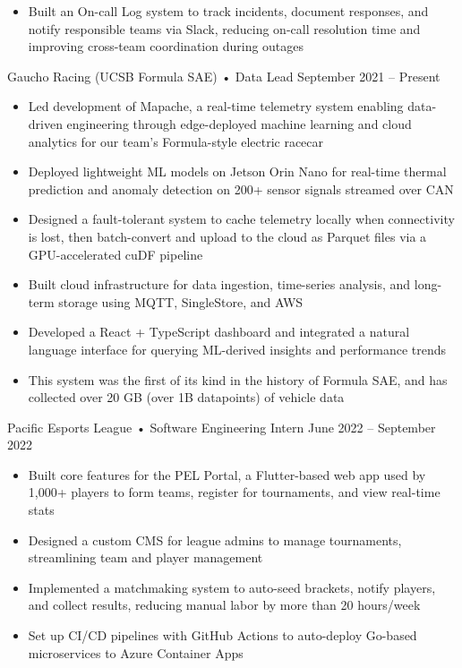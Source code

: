 \documentclass[9pt]{developercv} %
\begin{document}
\begin{entrylist}
{\begin{itemize}[noitemsep,topsep=0pt,parsep=0pt,partopsep=0pt, leftmargin=10pt]
            \item Built an On-call Log system to track incidents, document responses, and notify responsible teams via Slack, reducing on-call resolution time and improving cross-team coordination during outages
        \end{itemize}}
    \entry
		{}
		{Gaucho Racing (UCSB Formula SAE) • Data Lead}
		{September 2021 – Present}
		{\vspace{-8pt}
        \begin{itemize}[noitemsep,topsep=0pt,parsep=0pt,partopsep=0pt, leftmargin=10pt]
            \item Led development of Mapache, a real-time telemetry system enabling data-driven engineering through edge-deployed machine learning and cloud analytics for our team's Formula-style electric racecar
            \item Deployed lightweight ML models on Jetson Orin Nano for real-time thermal prediction and anomaly detection on 200+ sensor signals streamed over CAN
            \item Designed a fault-tolerant system to cache telemetry locally when connectivity is lost, then batch-convert and upload to the cloud as Parquet files via a GPU-accelerated cuDF pipeline
            \item Built cloud infrastructure for data ingestion, time-series analysis, and long-term storage using MQTT, SingleStore, and AWS
            \item Developed a React + TypeScript dashboard and integrated a natural language interface for querying ML-derived insights and performance trends
            \item This system was the first of its kind in the history of Formula SAE, and has collected over 20 GB (over 1B datapoints) of vehicle data
        \end{itemize}}
    \entry
        {}
        {Pacific Esports League • Software Engineering Intern}
        {June 2022 – September 2022}
        {\vspace{-8pt}
        \begin{itemize}[noitemsep,topsep=0pt,parsep=0pt,partopsep=0pt, leftmargin=10pt]
            \item Built core features for the PEL Portal, a Flutter-based web app used by 1,000+ players to form teams, register for tournaments, and view real-time stats
            \item Designed a custom CMS for league admins to manage tournaments, streamlining team and player management
            \item Implemented a matchmaking system to auto-seed brackets, notify players, and collect results, reducing manual labor by more than 20 hours/week
            \item Set up CI/CD pipelines with GitHub Actions to auto-deploy Go-based microservices to Azure Container Apps
        \end{itemize}}
\end{entrylist}
\vspace{-10pt}
\end{document}
